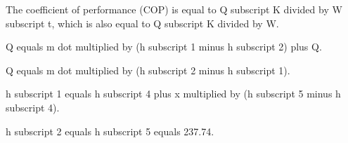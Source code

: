 The coefficient of performance (COP) is equal to Q subscript K divided by W subscript t, which is also equal to Q subscript K divided by W.  

Q equals m dot multiplied by (h subscript 1 minus h subscript 2) plus Q.  

Q equals m dot multiplied by (h subscript 2 minus h subscript 1).  

h subscript 1 equals h subscript 4 plus x multiplied by (h subscript 5 minus h subscript 4).  

h subscript 2 equals h subscript 5 equals 237.74.